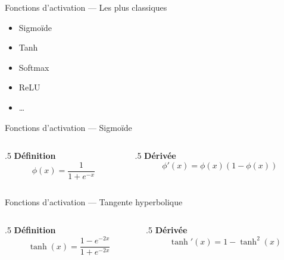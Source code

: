 \begin{frame}{Fonctions d'activation --- Les plus classiques}
  \begin{itemize}
  \item Sigmoïde
  \item Tanh
  \item Softmax
  \item ReLU
  \item …
  \end{itemize}
\end{frame}

\begin{frame}{Fonctions d'activation --- Sigmoïde}
  \begin{center}
  \end{center}

  \begin{columns}
    \begin{column}{.5\tw}
      \centering
      \textbf{Définition}
      \[
        \phi(x) = \frac{1}{1 + e^{-x}}
      \]
      \end{column}
    \begin{column}{{.5\tw}}
      \centering
      \textbf{Dérivée}
      \[
        \phi'(x) = \phi(x)(1 - \phi(x))
      \]
    \end{column}
  \end{columns}
\end{frame}

\begin{frame}{Fonctions d'activation --- Tangente hyperbolique}
  \begin{center}
  \end{center}

  \begin{columns}
    \begin{column}{.5\tw}
      \centering
      \textbf{Définition}
      \[
        \tanh(x) = \frac{1 - e^{-2x}}{1 + e^{-2x}}
      \]
      \end{column}
    \begin{column}{{.5\tw}}
      \centering
      \textbf{Dérivée}
      \[
        \tanh'(x) = 1 - \tanh^2(x)
      \]
    \end{column}
  \end{columns}
\end{frame}

